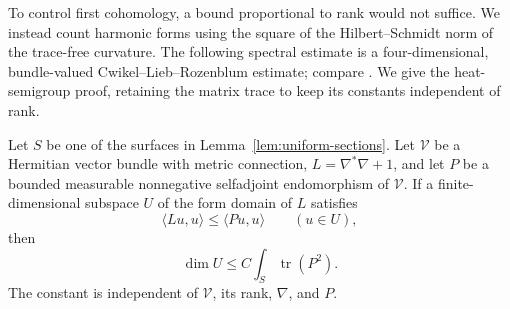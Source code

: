 To control first cohomology, a bound proportional to rank would
not suffice.  We instead count harmonic forms using the square of
the Hilbert--Schmidt norm of the trace-free curvature.  The following
spectral estimate is a four-dimensional, bundle-valued
Cwikel--Lieb--Rozenblum estimate; compare
\cite[Theorem~3.2 and Lemma~3.4]{Frank2014}. We give the
heat-semigroup proof, retaining the matrix trace to keep its constants
independent of rank.

\begin{lemma}\label{lem:matrix-spectral}
Let $S$ be one of the surfaces in Lemma~\ref{lem:uniform-sections}.
Let $\mathcal V$ be a Hermitian vector bundle with metric connection,
$L=\nabla^*\nabla+1$, and let $P$ be a bounded measurable
nonnegative selfadjoint endomorphism of $\mathcal V$.
If a finite-dimensional subspace $U$ of the form domain of $L$
satisfies
\begin{equation}\label{eq:spectral-form-hypothesis}
 \langle Lu,u\rangle\le\langle Pu,u\rangle\qquad(u\in U),
\end{equation}
then
\begin{equation}\label{eq:matrix-spectral-bound}
 \dim U\le C\int_S\operatorname{tr}(P^2).
\end{equation}
The constant is independent of $\mathcal V$, its rank, $\nabla$,
and $P$.
\end{lemma}

